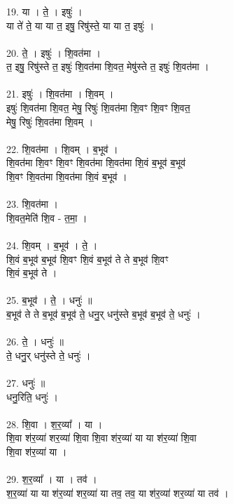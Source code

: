 \subsubsection{}
19. या । ते॒ । इषुः॑ ।\\
या ते॑ ते॒ या या त॒ इषु॒ रिषु॑स्ते॒ या या त॒ इषुः॑ ।\\
\\
20. ते॒ । इषुः॑ । शि॒वत॑मा ।\\
त॒ इषु॒ रिषु॑स्ते त॒ इषुः॑ शि॒वत॑मा शि॒वत॒ मेषु॑स्ते त॒ इषुः॑ शि॒वत॑मा ।\\
\\
21. इषुः॑ । शि॒वत॑मा । शि॒वम् ।\\
इषुः॑ शि॒वत॑मा शि॒वत॒ मेषु॒ रिषुः॑ शि॒वत॑मा शि॒वꣳ शि॒वꣳ शि॒वत॒\\
मेषु॒ रिषुः॑ शि॒वत॑मा शि॒वम् ।\\
\\
22. शि॒वत॑मा । शि॒वम् । ब॒भूव॑ ।\\
शि॒वत॑मा शि॒वꣳ शि॒वꣳ शि॒वत॑मा शि॒वत॑मा शि॒वं ब॒भूव॑ ब॒भूव॑\\
शि॒वꣳ शि॒वत॑मा शि॒वत॑मा शि॒वं ब॒भूव॑ ।\\
\\
23. शि॒वत॑मा ।\\
शि॒वत॒मेति॑ शि॒व - त॒मा॒ ।\\
\\
24. शि॒वम् । ब॒भूव॑ । ते॒ ।\\
शि॒वं ब॒भूव॑ ब॒भूव॑ शि॒वꣳ शि॒वं ब॒भूव॑ ते ते ब॒भूव॑ शि॒वꣳ\\
शि॒वं ब॒भूव॑ ते ।\\
\\
25. ब॒भूव॑ । ते॒ । धनुः॑ ॥\\
ब॒भूव॑ ते ते ब॒भूव॑ ब॒भूव॑ ते॒ धनु॒र् धनु॑स्ते ब॒भूव॑ ब॒भूव॑ ते॒ धनुः॑ ।\\
\\
26. ते॒ । धनुः॑ ॥\\
ते॒ धनु॒र् धनु॑स्ते ते॒ धनुः॑ ।\\
\\
27. धनुः॑ ॥\\
धनु॒रिति॒ धनुः॑ ।\\
\\
28. शि॒वा । श॒र॒व्या᳚ । या ।\\
शि॒वा श॑र॒व्या॑ शर॒व्या॑ शि॒वा शि॒वा श॑र॒व्या॑ या या श॑र॒व्या॑ शि॒वा\\
शि॒वा श॑र॒व्या॑ या ।\\
\\
29. श॒र॒व्या᳚ । या । तव॑ ।\\
श॒र॒व्या॑ या या श॑र॒व्या॑ शर॒व्या॑ या तव॒ तव॒ या श॑र॒व्या॑ शर॒व्या॑ या तव॑ ।\\
